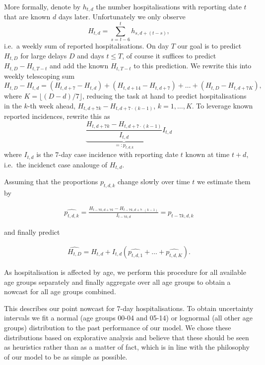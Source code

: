More formally, denote by \(h_{t,d}\) the number hospitalisations with
reporting date \(t\) that are known \(d\) days later. Unfortunately we
only observe \[H_{t,d} = \sum_{s = t - 6}^{t} h_{s,d + (t - s)},\]
i.e.~a weekly sum of reported hospitalisations. On day \(T\) our goal is
to predict \(H_{t,D}\) for large delays \(D\) and days \(t \leq T\), of
course it suffices to predict \(H_{t, D} - H_{t, T - t}\) and add the
known \(H_{t, T - t}\) to this prediction. We rewrite this into weekly
telescoping sum \[
H_{t,D} - H_{t,d} = \left(H_{t, d + 7} - H_{t,d}\right) + \left(H_{t, d + 14} - H_{t, d + 7}\right) + \dots + \left(H_{t,D} - H_{t, d + 7 K}\right),
\] where \(K = \lfloor (D -d) / 7 \rfloor\), reducing the task at hand
to predict hospitalisations in the \(k\)-th week ahead,
\(H_{t, d + 7k} - H_{t, d + 7\cdot(k - 1)}\), \(k = 1, \dots, K\). To
leverage known reported incidences, rewrite this as
\[\underbrace{\frac{H_{t, d + 7k} - H_{t, d + 7\cdot(k - 1)}}{I_{t,d}}}_{=:p_{t,d,k}} I_{t, d}\]
where \(I_{t,d}\) is the \(7\)-day case incidence with reporting date
\(t\) known at time \(t + d\), i.e.~the incidenct case analouge of
\(H_{t,d}\).

Assuming that the proportions \(p_{t,d,k}\) change slowly over time
\(t\) we estimate them by

\begin{align}
\label{eq:predict_p_tdk}
\widehat {p_{t,d,k}} = \frac{H_{t - 7k, d + 7k} - H_{t - 7k, d + 7\cdot(k - 1)}}{I_{t - 7k,d}} = p_{t - 7k,d,k}
\end{align}

and finally predict

\begin{align}
\label{eq:predict_H_tD}
\widehat{H_{t,D}} = H_{t,d} + I_{t,d} \left(\widehat{p_{t,d,1}} + \dots + \widehat{p_{t,d,K}}\right).
\end{align}

As hospitalisation is affected by age, we perform this procedure for all
available age groups separately and finally aggregate over all age
groups to obtain a nowcast for all age groups combined.

This describes our point nowcast for \(7\)-day hospitalisations. To
obtain uncertainty intervals we fit a normal (age groups 00-04 and
05-14) or lognormal (all other age groups) distribution to the past
performance of our model. We chose these distributions based on
explorative analysis and believe that these should be seen as heuristics
rather than as a matter of fact, which is in line with the philosophy of
our model to be as simple as possible.

